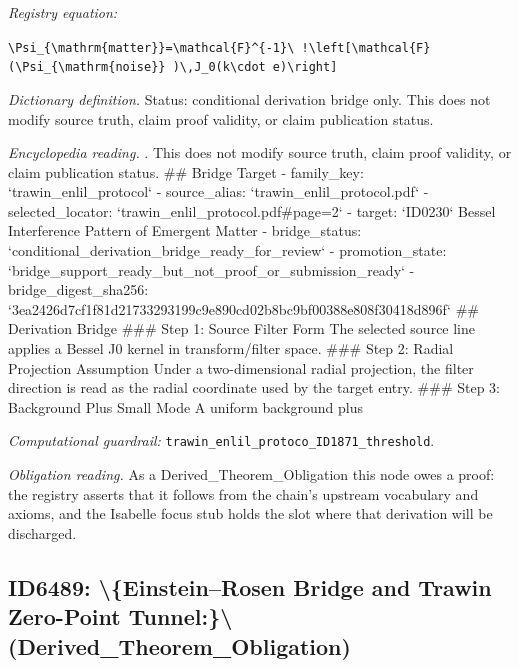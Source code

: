 \documentclass[11pt]{article}
\theoremstyle{remark}
\begin{document}
\noindent\textit{Registry equation:}\par
{\small\texttt{\textbackslash{}Psi\_\{\textbackslash{}mathrm\{matter\}\}=\textbackslash{}mathcal\{F\}\textasciicircum{}\{-1\}\textbackslash{} !\textbackslash{}left[\textbackslash{}mathcal\{F\}(\textbackslash{}Psi\_\{\textbackslash{}mathrm\{noise\}\} )\textbackslash{},J\_0(k\textbackslash{}cdot e)\textbackslash{}right]}}\par\medskip
\noindent\textit{Dictionary definition.} Status: conditional derivation bridge only. This does not modify source truth, claim proof validity, or claim publication status.\par\medskip
\noindent\textit{Encyclopedia reading.} . This does not modify source truth, claim proof validity, or claim publication status. \#\# Bridge Target - family\_key: `trawin\_enlil\_protocol` - source\_alias: `trawin\_enlil\_protocol.pdf` - selected\_locator: `trawin\_enlil\_protocol.pdf\#page=2` - target: `ID0230` Bessel Interference Pattern of Emergent Matter - bridge\_status: `conditional\_derivation\_bridge\_ready\_for\_review` - promotion\_state: `bridge\_support\_ready\_but\_not\_proof\_or\_submission\_ready` - bridge\_digest\_sha256: `3ea2426d7cf1f81d21733293199c9e890cd02b8bc9bf00388e808f30418d896f` \#\# Derivation Bridge \#\#\# Step 1: Source Filter Form The selected source line applies a Bessel J0 kernel in transform/filter space. \#\#\# Step 2: Radial Projection Assumption Under a two-dimensional radial projection, the filter direction is read as the radial coordinate used by the target entry. \#\#\# Step 3: Background Plus Small Mode A uniform background plus
\par\medskip\noindent\textit{Computational guardrail:} \texttt{trawin\_enlil\_protoco\_ID1871\_threshold}.
\par\medskip\noindent\textit{Obligation reading.} As a Derived\_Theorem\_Obligation this node owes a proof: the registry asserts that it follows from the chain's upstream vocabulary and axioms, and the Isabelle focus stub holds the slot where that derivation will be discharged.

\subsection{ID6489: \textbackslash{}\{Einstein--Rosen Bridge and Trawin Zero-Point Tunnel:\}\textbackslash{} (Derived\_Theorem\_Obligation)}
\end{document}
